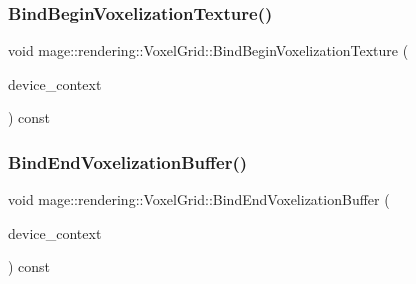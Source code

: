 \hypertarget{classmage_1_1rendering_1_1_voxel_grid_a00fa75aaed950df37be237c9b8557eeb}{}\label{classmage_1_1rendering_1_1_voxel_grid_a00fa75aaed950df37be237c9b8557eeb} 
\subsubsection{\texorpdfstring{Bind\+Begin\+Voxelization\+Texture()}{BindBeginVoxelizationTexture()}}
{\footnotesize\ttfamily void mage\+::rendering\+::\+Voxel\+Grid\+::\+Bind\+Begin\+Voxelization\+Texture (\begin{DoxyParamCaption}\item[{I\+D3\+D11\+Device\+Context \&}]{device\+\_\+context }\end{DoxyParamCaption}) const\hspace{0.3cm}{\ttfamily [noexcept]}}

\hypertarget{classmage_1_1rendering_1_1_voxel_grid_a2da6ce7a6880b1fc65b36757d8111062}{}\label{classmage_1_1rendering_1_1_voxel_grid_a2da6ce7a6880b1fc65b36757d8111062} 
\subsubsection{\texorpdfstring{Bind\+End\+Voxelization\+Buffer()}{BindEndVoxelizationBuffer()}}
{\footnotesize\ttfamily void mage\+::rendering\+::\+Voxel\+Grid\+::\+Bind\+End\+Voxelization\+Buffer (\begin{DoxyParamCaption}\item[{I\+D3\+D11\+Device\+Context \&}]{device\+\_\+context }\end{DoxyParamCaption}) const\hspace{0.3cm}{\ttfamily [noexcept]}}

\hypertarget{classmage_1_1rendering_1_1_voxel_grid_ac404f5cb8fd1293e2351ae6106f37fe5}{}\label{classmage_1_1rendering_1_1_voxel_grid_ac404f5cb8fd1293e2351ae6106f37fe5} 
